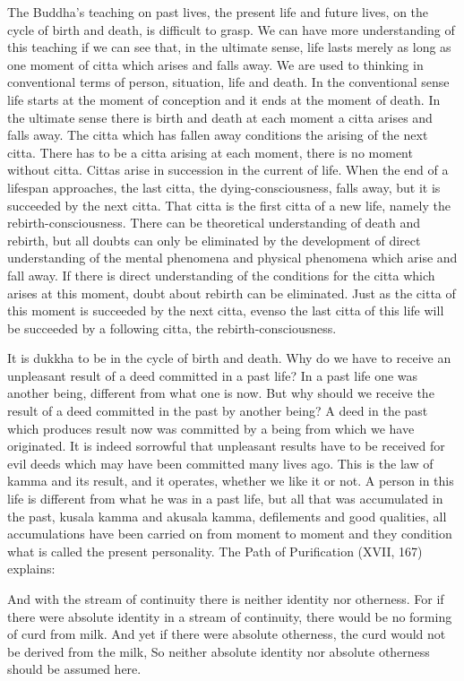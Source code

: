 \documentclass{book}
\begin{document}
The Buddha's teaching on past lives, the present life and future lives,
on the cycle of birth and death, is difficult to grasp. We can have more
understanding of this teaching if we can see that, in the ultimate
sense, life lasts merely as long as one moment of citta which arises and
falls away. We are used to thinking in conventional terms of person,
situation, life and death. In the conventional sense life starts at the
moment of conception and it ends at the moment of death. In the ultimate
sense there is birth and death at each moment a citta arises and falls
away. The citta which has fallen away conditions the arising of the next
citta. There has to be a citta arising at each moment, there is no
moment without citta. Cittas arise in succession in the current of life.
When the end of a lifespan approaches, the last citta, the
dying-conscious­ness, falls away, but it is succeeded by the next citta.
That citta is the first citta of a new life, namely the
rebirth-consciousness. There can be theoretical under­standing of death
and rebirth, but all doubts can only be eliminated by the development of
direct understanding of the mental phenomena and physical phenomena
which arise and fall away. If there is direct understanding of the
conditions for the citta which arises at this moment, doubt about
rebirth can be eliminated. Just as the citta of this moment is succeeded
by the next citta, evenso the last citta of this life will be succeeded
by a following citta, the rebirth-consciousness.

It is dukkha to be in the cycle of birth and death. Why do we have to
receive an unpleasant result of a deed committed in a past life? In a
past life one was another being, different from what one is now. But why
should we receive the result of a deed committed in the past by another
being? A deed in the past which produces result now was committed by a
being from which we have originated. It is indeed sorrowful that
unpleasant results have to be received for evil deeds which may have
been committed many lives ago. This is the law of kamma and its result,
and it operates, whether we like it or not. A person in this life is
different from what he was in a past life, but all that was accumulated
in the past, kusala kamma and akusala kamma, defilements and good
qualities, all accumulations have been carried on from moment to moment
and they condition what is called the present personality. The Path of
Purification (XVII, 167) explains:

And with the stream of continuity there is neither identity nor
otherness. For if there were absolute identity in a stream of
continuity, there would be no forming of curd from milk. And yet if
there were absolute otherness, the curd would not be derived from the
milk, So neither absolute identity nor absolute otherness should be
assumed here.
\end{document}
